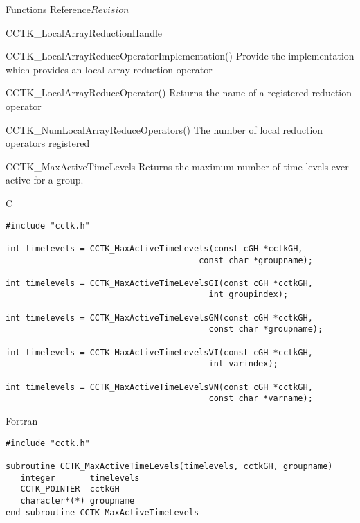 \begin{cactuspart}{ Functions Reference}{}{$Revision$}
\begin{FunctionDescription}{CCTK\_LocalArrayReductionHandle}
\begin{SeeAlsoSection}
\begin{SeeAlso}{CCTK\_LocalArrayReduceOperatorImplementation()}
Provide the implementation which provides an local array reduction operator
\end{SeeAlso}

\begin{SeeAlso}{CCTK\_LocalArrayReduceOperator()}
Returns the name of a registered reduction operator
\end{SeeAlso}

\begin{SeeAlso}{CCTK\_NumLocalArrayReduceOperators()}
The number of local reduction operators registered
\end{SeeAlso}
\end{SeeAlsoSection}
\end{FunctionDescription}



\begin{FunctionDescription}{CCTK\_MaxActiveTimeLevels}
\label{CCTK-MaxActiveTimeLevels}
Returns the maximum number of time levels ever active for a group.

\begin{SynopsisSection}
\begin{Synopsis}{C}
\begin{verbatim}
#include "cctk.h"

int timelevels = CCTK_MaxActiveTimeLevels(const cGH *cctkGH,
                                       const char *groupname);

int timelevels = CCTK_MaxActiveTimeLevelsGI(const cGH *cctkGH,
                                         int groupindex);

int timelevels = CCTK_MaxActiveTimeLevelsGN(const cGH *cctkGH,
                                         const char *groupname);

int timelevels = CCTK_MaxActiveTimeLevelsVI(const cGH *cctkGH,
                                         int varindex);

int timelevels = CCTK_MaxActiveTimeLevelsVN(const cGH *cctkGH,
                                         const char *varname);
\end{verbatim}
\end{Synopsis}
\begin{Synopsis}{Fortran}
\begin{verbatim}
#include "cctk.h"

subroutine CCTK_MaxActiveTimeLevels(timelevels, cctkGH, groupname)
   integer       timelevels
   CCTK_POINTER  cctkGH
   character*(*) groupname
end subroutine CCTK_MaxActiveTimeLevels


\end{verbatim}
\end{Synopsis}
\end{SynopsisSection}
\end{FunctionDescription}
\end{cactuspart}
